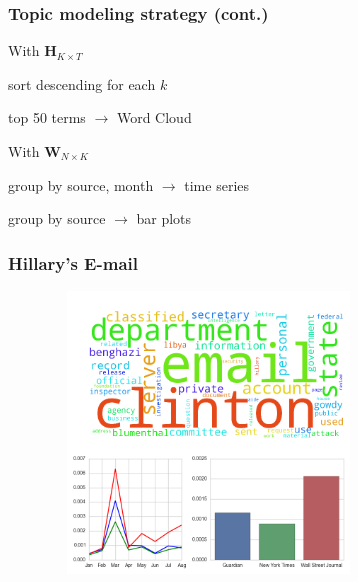 \documentclass[11pt]{beamer}
\newenvironment{innerlist}[1][\enskip\textbullet]%
        {\begin{compactenum}[#1]}{\end{compactenum}}
\begin{document}

\begin{frame}
\frametitle{Topic modeling strategy (cont.)}


\vspace{5mm}

\begin{itemize}
	\item With $\mathbf{H}_{K \times T}$
	\vspace{2mm}
	\begin{innerlist}
		\item sort descending for each $k$ 
		\item top 50 terms $\rightarrow$ Word Cloud
	\end{innerlist}
	\vspace{6mm}
	\item With $\mathbf{W}_{N \times K}$
	\vspace{2mm}
	\begin{innerlist}
		\item group by source, month $\rightarrow$ time series
		\item group by source  $\rightarrow$ bar plots
	\end{innerlist}
\end{itemize}


\end{frame}



\begin{frame}
\frametitle{Hillary's E-mail}

\begin{figure}
\centering
\includegraphics[width=85mm,height=75mm]{figures/source_topic0.png}
\end{figure} 

\end{frame}
\end{document}

